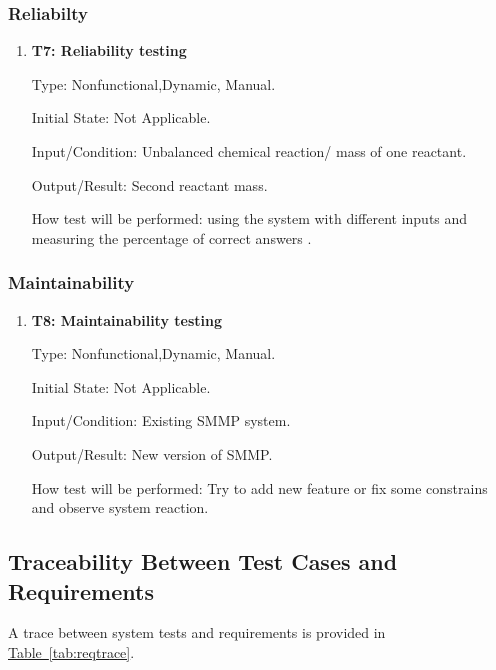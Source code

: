 \documentclass[12pt, titlepage]{article}
\begin{document}
\subsubsection{Reliabilty}


\begin{enumerate}

\item{\bf T7: Reliability testing\\}

Type: Nonfunctional,Dynamic, Manual.
					
Initial State:  Not Applicable.
					
Input/Condition:  Unbalanced chemical reaction/ mass of one reactant.
					
Output/Result:  Second reactant mass.
					
How test will be performed: using the system with different inputs and measuring the percentage of correct answers . 
\end{enumerate}

\subsubsection{Maintainability}


\begin{enumerate}

\item{\bf T8: Maintainability testing\\}

Type: Nonfunctional,Dynamic, Manual.
					
Initial State:  Not Applicable.
					
Input/Condition:  Existing SMMP system.
					
Output/Result:  New version of SMMP.
					
How test will be performed: Try to add new feature or fix some constrains and observe system reaction.

\end{enumerate}
\subsection{Traceability Between Test Cases and Requirements}
A trace between system tests and requirements is provided in 
\hyperref[tab:reqtrace]{Table~\ref*{tab:reqtrace}}.
\end{document}
